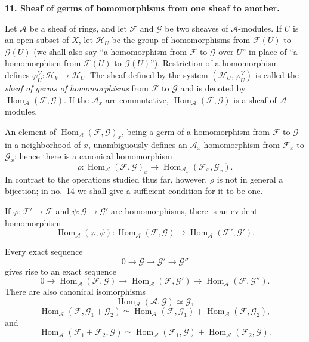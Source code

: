 
\medskip
{}\label{fac:I:1:no:11}
\textbf{11. Sheaf of germs of homomorphisms from one sheaf to another.}

Let $\mathcal{A}$ be a sheaf of rings, and let $\mathcal{F}$ and $\mathcal{G}$ be two sheaves of $\mathcal{A}$-modules. If $U$ is an open subset of $X$, let $\mathcal{H}_U$ be the group of homomorphisms from $\mathcal{F}(U)$ to $\mathcal{G}(U)$ (we shall also say ``a homomorphism from $\mathcal{F}$ to $\mathcal{G}$ over $U$'' in place of ``a homomorphism from $\mathcal{F}(U)$ to $\mathcal{G}(U)$''). Restriction of a homomorphism defines $\varphi_U^V:\mathcal{H}_V\to\mathcal{H}_U$. The sheaf defined by the system $(\mathcal{H}_U,\varphi_U^V)$ is called the \textit{sheaf of germs of homomorphisms} from $\mathcal{F}$ to $\mathcal{G}$ and is denoted by $\operatorname{Hom}_{\mathcal{A}}(\mathcal{F},\mathcal{G})$. If the $\mathcal{A}_x$ are commutative, $\operatorname{Hom}_{\mathcal{A}}(\mathcal{F},\mathcal{G})$ is a sheaf of $\mathcal{A}$-modules.

An element of $\operatorname{Hom}_{\mathcal{A}}(\mathcal{F},\mathcal{G})_x$, being a germ of a homomorphism from $\mathcal{F}$ to $\mathcal{G}$ in a neighborhood of $x$, unambiguously defines an $\mathcal{A}_x$-homomorphism from $\mathcal{F}_x$ to $\mathcal{G}_x$; hence there is a canonical homomorphism
\[
\rho:\operatorname{Hom}_{\mathcal{A}}(\mathcal{F},\mathcal{G})_x
\longrightarrow
\operatorname{Hom}_{\mathcal{A}_x}(\mathcal{F}_x,\mathcal{G}_x).
\]
In contrast to the operations studied thus far, however, $\rho$ is not in general a bijection; in \hyperref[fac:I:2:no:14]{no.~14} we shall give a sufficient condition for it to be one.

If $\varphi:\mathcal{F}'\to\mathcal{F}$ and $\psi:\mathcal{G}\to\mathcal{G}'$ are homomorphisms, there is an evident homomorphism
\[
\operatorname{Hom}_{\mathcal{A}}(\varphi,\psi):
\operatorname{Hom}_{\mathcal{A}}(\mathcal{F},\mathcal{G})
\longrightarrow
\operatorname{Hom}_{\mathcal{A}}(\mathcal{F}',\mathcal{G}').
\]

Every exact sequence
\[
0\longrightarrow\mathcal{G}\longrightarrow\mathcal{G}'\longrightarrow\mathcal{G}''
\]
gives rise to an exact sequence
\[
0\longrightarrow\operatorname{Hom}_{\mathcal{A}}(\mathcal{F},\mathcal{G})
\longrightarrow\operatorname{Hom}_{\mathcal{A}}(\mathcal{F},\mathcal{G}')
\longrightarrow\operatorname{Hom}_{\mathcal{A}}(\mathcal{F},\mathcal{G}'').
\]
There are also canonical isomorphisms
\[
\operatorname{Hom}_{\mathcal{A}}(\mathcal{A},\mathcal{G})\simeq\mathcal{G},
\]
\[
\operatorname{Hom}_{\mathcal{A}}(\mathcal{F},\mathcal{G}_1+\mathcal{G}_2)
\simeq
\operatorname{Hom}_{\mathcal{A}}(\mathcal{F},\mathcal{G}_1)
+\operatorname{Hom}_{\mathcal{A}}(\mathcal{F},\mathcal{G}_2),
\]
and
\[
\operatorname{Hom}_{\mathcal{A}}(\mathcal{F}_1+\mathcal{F}_2,\mathcal{G})
\simeq
\operatorname{Hom}_{\mathcal{A}}(\mathcal{F}_1,\mathcal{G})
+\operatorname{Hom}_{\mathcal{A}}(\mathcal{F}_2,\mathcal{G}).
\]

